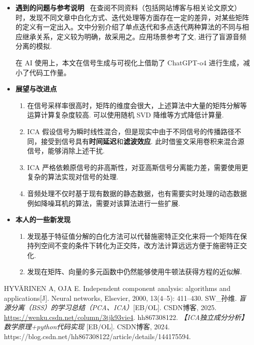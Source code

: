 \documentclass{article}
\newcommand{\np}{\indent\par}
\begin{document}
\begin{itemize}
    \item \textbf{遇到的问题与参考说明} \ 
    在查阅不同资料（包括网站博客与相关论文原文）时，发现不同文章中白化方式、迭代处理等方面存在一定的差异，对某些矩阵的定义有一定出入。文\cite{1}中分别介绍了单点迭代和多点迭代两种算法的不同与相应继承关系，定义较为明确，故采用之。应用场景参考了文\cite{3}, 进行了盲源音频分离的模拟. \np
    在 AI 使用上，本文在信号生成与可视化上借助了 ChatGPT-o4 进行生成，减小了代码工作量。 \np
    \item \textbf{展望与改进点} 
    \begin{enumerate}
        \item 在信号采样率很高时，矩阵的维度会很大，上述算法中大量的矩阵分解等运算计算复杂度较高. 可以使用随机 SVD 降维等方式降低计算量.
        \item ICA 假设信号为瞬时线性混合，但是现实中由于不同信号的传播路径不同，接受到信号具有\textbf{时间延迟}和\textbf{滤波效应}. 此时借鉴文\cite{2}采用卷积来混合源信号，能够消除上述干扰.
        \item ICA 严格依赖原信号的非高斯性，对亚高斯信号分离能力差，需要使用更复杂的算法实现对信号的处理.
        \item 音频处理不仅时基于现有数据的静态数据，也有需要实时处理的动态数据例如降噪耳机的算法，需要对该算法进行一些扩展.
    \end{enumerate}
    \item \textbf{本人的一些新发现} 
    \begin{enumerate}
        \item 发现基于特征值分解的白化方法可以代替施密特正交化来将一个矩阵在保持列空间不变的条件下转化为正交阵，改方法计算远远方便于施密特正交化.
        \item 发现在矩阵、向量的多元函数中仍然能够使用牛顿法获得方程的近似解.
    \end{enumerate}
\end{itemize}



\begin{thebibliography}{99}
     HYVÄRINEN A, OJA E. Independent component analysis: algorithms and applications[J]. Neural networks, Elsevier, 2000, 13(4–5): 411–430.
    \bibitem{2} 
    SW\_孙维. 
    \textit{盲源分离（BSS）的学习总结（PCA、ICA）}[EB/OL]. 
    CSDN博客, 
    2025. 
    \url{https://wenku.csdn.net/column/3tjk93vie4}.    
     hh867308122. \textit{【ICA独立成分分析】数学原理+python代码实现} [EB/OL]. CSDN博客, 2024. https://blog.csdn.net/hh867308122/article/details/144175594.
\end{thebibliography}

\printbibliography
\end{document}
